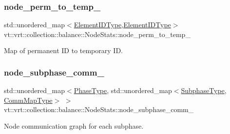 \subsubsection{\texorpdfstring{node\+\_\+perm\+\_\+to\+\_\+temp\+\_\+}{node\_perm\_to\_temp\_}}
{\footnotesize\ttfamily std\+::unordered\+\_\+map$<$\hyperlink{namespacevt_1_1vrt_1_1collection_1_1balance_a14c8d2c972f2913aa3f1636e5be0a120}{Element\+I\+D\+Type},\hyperlink{namespacevt_1_1vrt_1_1collection_1_1balance_a14c8d2c972f2913aa3f1636e5be0a120}{Element\+I\+D\+Type}$>$ vt\+::vrt\+::collection\+::balance\+::\+Node\+Stats\+::node\+\_\+perm\+\_\+to\+\_\+temp\+\_\+\hspace{0.3cm}{\ttfamily [private]}}



Map of permanent ID to temporary ID. 

\mbox{\label{structvt_1_1vrt_1_1collection_1_1balance_1_1_node_stats_a70b5f9052ce87030b3476800e428bcb2}} 
\subsubsection{\texorpdfstring{node\+\_\+subphase\+\_\+comm\+\_\+}{node\_subphase\_comm\_}}
{\footnotesize\ttfamily std\+::unordered\+\_\+map$<$\hyperlink{namespacevt_a46ce6733d5cdbd735d561b7b4029f6d7}{Phase\+Type}, std\+::unordered\+\_\+map$<$\hyperlink{namespacevt_ae78cbfdf1e57470e33eedb074f2beeba}{Subphase\+Type}, \hyperlink{namespacevt_1_1vrt_1_1collection_1_1balance_a10860c956804d644db54a16012352728}{Comm\+Map\+Type}$>$ $>$ vt\+::vrt\+::collection\+::balance\+::\+Node\+Stats\+::node\+\_\+subphase\+\_\+comm\+\_\+\hspace{0.3cm}{\ttfamily [private]}}



Node communication graph for each subphase. 

\mbox{\label{structvt_1_1vrt_1_1collection_1_1balance_1_1_node_stats_aa9c06fa76c472858769ebe545f29d7a2}} 
